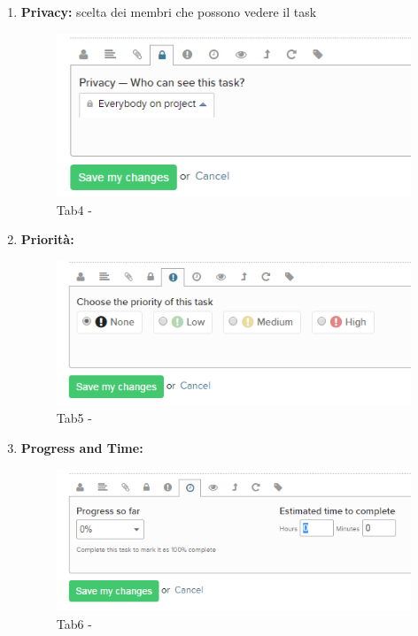 \documentclass[a4paper,11pt]{article}
\begin{document}
\begin{enumerate}
		\item \textbf{Privacy:}  scelta dei membri che possono vedere il task
			\begin{figure}[H]
			\centering
			\includegraphics[scale=0.50]{../images/teamwork_task4.png}
			\caption{ Tab4 -  }			
			\end{figure}
		
		\item \textbf{Priorità:} 
			\begin{figure}[H]
			\centering
			\includegraphics[scale=0.50]{../images/teamwork_task5.png}
			\caption{ Tab5 -  }
			\end{figure}
		
		\item \textbf{Progress and Time:} 
			\begin{figure}[H]
			\centering
			\includegraphics[scale=0.50]{../images/teamwork_task6.png}
			\caption{  Tab6 -  }	
			\end{figure}
			

\end{enumerate}
\end{document}
